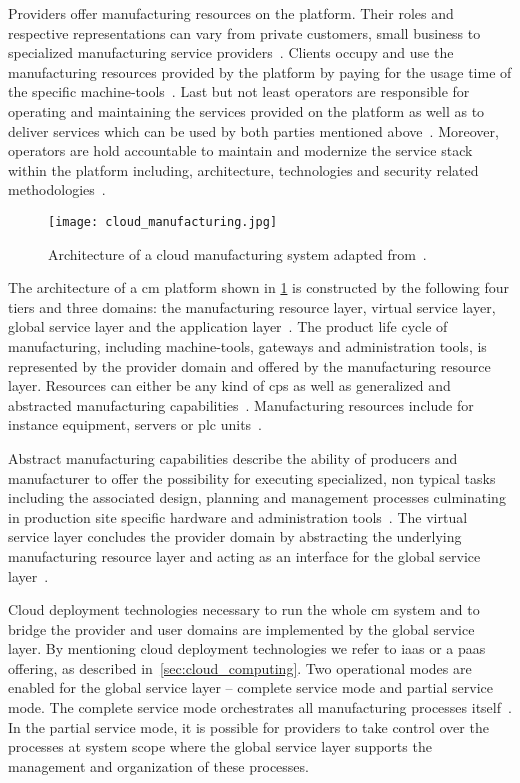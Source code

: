 \documentclass[
a4paper,
twoside,
headsepline,
cleardoublepage=empty,
parskip=half,
draft=false
]{scrbook}
\begin{document}
			Providers offer manufacturing resources on the platform.
			Their roles and respective representations can vary from private customers, small business to specialized manufacturing service providers~\cite{tao2014cciot}.
			Clients occupy and use the manufacturing resources provided by the platform by paying for the usage time of the specific machine-tools~\cite{he2015state}.
			Last but not least operators are responsible for operating and maintaining the services provided on the platform as well as to deliver services which can be used by both parties mentioned above~\cite{xu2012cloud}.
			Moreover, operators are hold accountable to maintain and modernize the service stack within the platform including, architecture, technologies and security related methodologies~\cite{tedeschi2015security}.

			\begin{figure}[htbp]
				\centering
				\texttt{[image: cloud\_manufacturing.jpg]}
				\caption{Architecture of a cloud manufacturing system adapted from~\cite{xu2012cloud}.}
				\label{fig:cloud_manufacturing}
			\end{figure}

			The architecture of a \gls{cm} platform shown in \cref{fig:cloud_manufacturing} is constructed by the following four tiers and three domains: the manufacturing resource layer, virtual service layer, global service layer and the application layer~\cite{wu2013cloud}.
			The product life cycle of manufacturing, including machine-tools, gateways and administration tools, is represented by the provider domain and offered by the manufacturing resource layer.
			Resources can either be any kind of \gls{cps} as well as generalized and abstracted manufacturing capabilities~\cite{kleinemeier2014automatisierungspyramide}.
			Manufacturing resources include for instance equipment, servers or \gls{plc} units~\cite{xu2012cloud}.
			
			Abstract manufacturing capabilities describe the ability of producers and manufacturer to offer the possibility for executing specialized, non typical tasks including the associated design, planning and management processes culminating in production site specific hardware and administration tools~\cite{he2015state}.
			The virtual service layer concludes the provider domain by abstracting the underlying manufacturing resource layer and acting as an interface for the global service layer~\cite{xu2012cloud}.
			
			Cloud deployment technologies necessary to run the whole \gls{cm} system and to bridge the provider and user domains are implemented by the global service layer.
			By mentioning cloud deployment technologies we refer to \gls{iaas} or a \gls{paas} offering, as described in~\cref{sec:cloud_computing}.
			Two operational modes are enabled for the global service layer -- complete service mode and partial service mode.
			The complete service mode orchestrates all manufacturing processes itself~\cite{xu2012cloud}.
			In the partial service mode, it is possible for providers to take control over the processes at system scope where the global service layer supports the management and organization of these processes.
			
\end{document}
